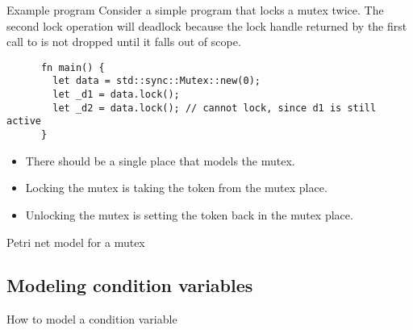 \documentclass{beamer}
\begin{document}
\begin{frame}[fragile]{Example program}
  Consider a simple program that locks a mutex twice.
  The second lock operation will deadlock
  because the lock handle returned by the first call to 
  is not dropped until it falls out of scope.

  \vfill

  \begin{listing}
    \begin{verbatim}
      fn main() {
        let data = std::sync::Mutex::new(0);
        let _d1 = data.lock();
        let _d2 = data.lock(); // cannot lock, since d1 is still active
      }
    \end{verbatim}
  \end{listing}

  \vfill
  
  \begin{itemize}
    \item There should be a single place that models the mutex.
    \item Locking the mutex is taking the token from the mutex place.
    \item Unlocking the mutex is setting the token back in the mutex place.
  \end{itemize}
\end{frame}

\begin{frame}{Petri net model for a mutex}
  \begin{figure}
    \centering
    
  \end{figure}
\end{frame}

\subsection{Modeling condition variables}

\begin{frame}{How to model a condition variable}
  \begin{figure}
    \centering
    
  \end{figure}
\end{frame}
\end{document}
